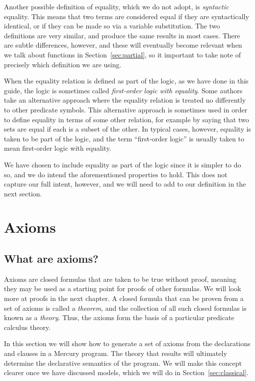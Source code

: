 Another possible definition of equality,
which we do not adopt,
is \emph{syntactic} equality.
This means that two terms are considered equal
if they are syntactically identical,
or if they can be made so via a variable substitution.
The two definitions are very similar,
and produce the same results in most cases.
There are subtle differences, however,
and these will eventually become relevant
when we talk about  functions
in Section~\ref{sec:partial},
so it important to take note of
precisely which definition we are using.

When the equality relation is defined as part of the logic,
as we have done in this guide,
the logic is sometimes called
\emph{first-order logic with equality}.
Some authors take an alternative approach where
the equality relation is treated
no differently to other predicate symbols.
This alternative approach is sometimes used in order to
define equality in terms of some other relation,
for example by saying that
two sets are equal if each is a subset of the other.
In typical cases, however,
equality is taken to be part of the logic,
and the term ``first-order logic''
is usually taken to mean first-order logic with equality.

We have chosen to include equality as part of the logic
since it is simpler to do so,
and we do intend the aforementioned properties to hold.
This does not capture our full intent, however,
and we will need to add to our definition in the next section.


\section{Axioms}
\label{sec:axioms}

\subsection{What are axioms?}
\label{gi:axiom}

Axioms are closed formulas that are taken to be true without proof,
meaning they may be used as a starting point for
proofs of other formulas.
We will look more at proofs in the next chapter.
A closed formula that can be proven from a set of axioms
is called a \emph{theorem\label{gi:theorem}},
and the collection of all such closed formulas
is known as a \emph{theory}.
Thus, the axioms form the basis of
a particular predicate calculus theory.

In this section we will show how to generate a set of axioms
from the declarations and clauses in a Mercury program.
The theory that results will ultimately determine
the declarative semantics of the program.
We will make this concept clearer
once we have discussed models,
which we will do in Section~\ref{sec:classical}.

